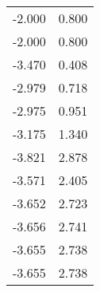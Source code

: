 
\begin{table}[h]
\centering
\begin{tabular}{cc}
-2.000	&	0.800	 \\ 
-2.000	&	0.800	 \\ 
-3.470	&	0.408	 \\ 
-2.979	&	0.718	 \\ 
-2.975	&	0.951	 \\ 
-3.175	&	1.340	 \\ 
-3.821	&	2.878	 \\ 
-3.571	&	2.405	 \\ 
-3.652	&	2.723	 \\ 
-3.656	&	2.741	 \\ 
-3.655	&	2.738	 \\ 
-3.655	&	2.738	 \\ 
\end{tabular}
\end{table}
